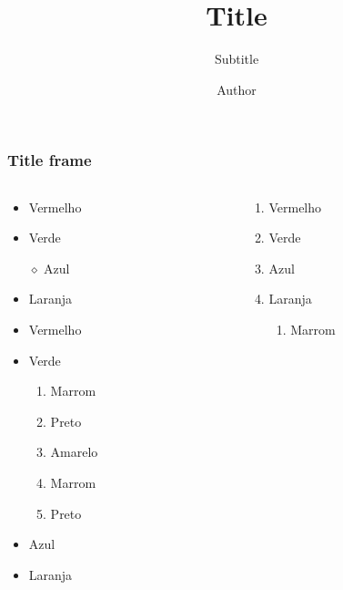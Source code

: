 \documentclass[12pt]{beamer}
\title{Title}
\subtitle{Subtitle}
\author{Author}
\begin{document}


\begin{frame}
    \frametitle{Title frame}
    \footnotesize
    \begin{columns}
        \begin{column}{4cm}
            \begin{itemize}
                \item Vermelho \theordem
                \item Verde \theordem
                \item [$\diamond$]Azul \theordem
                \item Laranja \theordem
                \item Vermelho \theordem
                \item Verde \theordem
                \begin{enumerate}
                    \item Marrom \theordem
                    \item Preto \theordem
                    \item Amarelo \theordem
                    \item Marrom \theordem
                    \item Preto \theordem
                \end{enumerate}
                \item <2>Azul \theordem
                \item <2>[$\diamond$]Laranja \theordem
            \end{itemize}
        \end{column}
        \setcounter{ordem}{0}
        \begin{column}{4cm}
            \begin{enumerate}
                \item Vermelho \theordem
                \item <2>Verde \theordem
                \item Azul \theordem
                \item Laranja \theordem
                \begin{enumerate}
                    \item <3> Marrom \theordem

\end{enumerate}
\end{enumerate}
\end{column}
\end{columns}
\end{frame}
\end{document}
